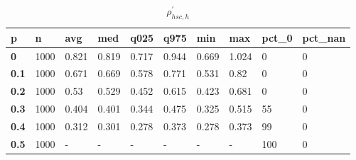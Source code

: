 \begin{table}[h]
 \centering 
\footnotesize
\caption{$\rho_{hsc,h}^\prime $}
\label{tab:alphahsch}
\begin{tabular}[h]{|l|l|l|l|l|l|l|l|l|l|
    } \hline
\textbf{ p} & \textbf{ n} & \textbf{ avg} & \textbf{ med} & \textbf{ q025} & \textbf{ q975} & \textbf{ min} & \textbf{ max} & \textbf{ pct\_0} & \textbf{ pct\_nan}
    \\ \hline
  \textbf{  0} & 1000 & 0.821 & 0.819 & 0.717 & 0.944 & 0.669 & 1.024 &   0 & 0
    \\ \hline
  \textbf{0.1} & 1000 & 0.671 & 0.669 & 0.578 & 0.771 & 0.531 &  0.82 &   0 & 0
    \\ \hline
  \textbf{0.2} & 1000 &  0.53 & 0.529 & 0.452 & 0.615 & 0.423 & 0.681 &   0 & 0
    \\ \hline
  \textbf{0.3} & 1000 & 0.404 & 0.401 & 0.344 & 0.475 & 0.325 & 0.515 &  55 & 0
    \\ \hline
  \textbf{0.4} & 1000 & 0.312 & 0.301 & 0.278 & 0.373 & 0.278 & 0.373 &  99 & 0
    \\ \hline
  \textbf{0.5} & 1000 & - & - & - & - & - & - & 100 & 0
    \\ \hline
 \end{tabular}
 \end{table}
